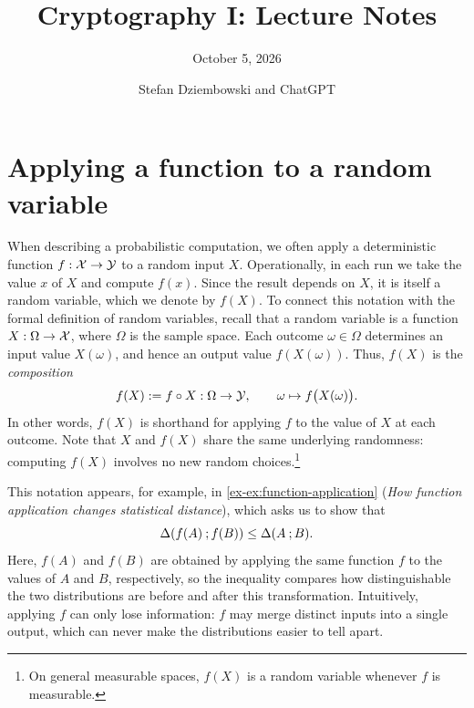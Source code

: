 \documentclass{llncs}
\title{Cryptography I: Lecture Notes}
\subtitle{October 5, 2026}
\author{Stefan Dziembowski and ChatGPT}
\institute{University of Warsaw}
\begin{document}
\maketitle

\section{Applying a function to a random variable}

When describing a probabilistic computation, we often apply a deterministic
function $f: {\mathcal X} \rightarrow {\mathcal Y}$ to a random input $X$. Operationally, in
each run we take the value $x$ of $X$ and compute $f(x)$. Since the result
depends on $X$, it is itself a random variable, which we denote by $f(X)$.
To connect this notation with the formal definition of random variables, recall that a random
variable is a function $X: \Omega \rightarrow {\mathcal X}$, where $\Omega$ is the
sample space. Each outcome $\omega \in \Omega$ determines an input value
$X(\omega)$, and hence an output value $f(X(\omega))$. Thus, $f(X)$ is the
\emph{composition}
\[
    f(X) := f \circ X: \Omega \rightarrow {\mathcal Y},
    \qquad
    \omega \mapsto f\bigl(X(\omega)\bigr).
\]
In other words, $f(X)$ is shorthand for applying $f$ to the value of $X$ at
each outcome.
Note that $X$ and $f(X)$ share the same underlying randomness: computing
$f(X)$ involves no new random choices.\footnote{On general measurable spaces,
$f(X)$ is a random variable whenever $f$ is measurable.}

This notation appears, for example, in \ref{ex-ex:function-application}
(\emph{How function application changes statistical distance}), which asks
us to show that
\[
    \Delta(f(A) \: ; f(B)) \leq \Delta(A \: ; B).
\]
Here, $f(A)$ and $f(B)$ are obtained by applying the same function $f$ to the
values of $A$ and $B$, respectively, so the inequality compares how
distinguishable the two distributions are before and after this
transformation. Intuitively, applying $f$ can only lose information: $f$ may
merge distinct inputs into a single output, which can never make the
distributions easier to tell apart.     
\end{document}
